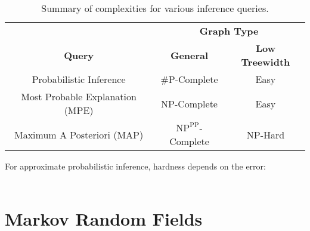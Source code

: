 				\begin{table}
					\centering
					\begin{tabular}{c|c|c}
						\toprule
						                                & \multicolumn{2}{c}{\textbf{Graph Type}}                   \\
						\textbf{Query}                  & \textbf{General}                 & \textbf{Low Treewidth} \\ \midrule
						Probabilistic Inference         & \#P-Complete                     & Easy                   \\
						Most Probable Explanation (MPE) & NP-Complete                      & Easy                   \\
						Maximum A Posteriori (MAP)      & \(\text{NP}^\text{PP}\)-Complete & NP-Hard                \\ \bottomrule
					\end{tabular}
					\begin{center}
						For approximate probabilistic inference, hardness depends on the error: \\
						 \\
					\end{center}
					\vspace{-0.4cm}
					\caption[Summary of Inference Complexities]{Summary of complexities for various inference queries.}
					\label{fig:inferenceComplexity}
				\end{table}

\chapter{Markov Random Fields}
	\label{c:mrf}

